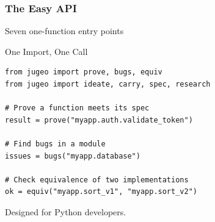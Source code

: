 \begin{frame}[fragile]
\frametitle{The Easy API}
\begin{center}
  {\Large Seven one-function entry points}
\end{center}
\vspace{8pt}
\begin{exampleblock}{One Import, One Call}
\begin{lstlisting}
from jugeo import prove, bugs, equiv
from jugeo import ideate, carry, spec, research

# Prove a function meets its spec
result = prove("myapp.auth.validate_token")

# Find bugs in a module
issues = bugs("myapp.database")

# Check equivalence of two implementations
ok = equiv("myapp.sort_v1", "myapp.sort_v2")
\end{lstlisting}
\end{exampleblock}
\vfill
\begin{center}
   Designed for Python developers.
\end{center}
\end{frame}

